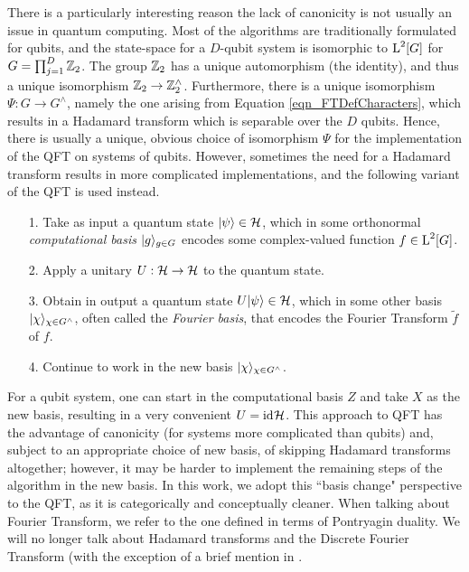 There is a particularly interesting reason the lack of canonicity is not usually an issue in quantum computing. Most of the algorithms are traditionally formulated for qubits, and the state-space for a $D$-qubit system is isomorphic to $\operatorname{L}^2[G]$ for $G = \prod_{j=1}^D \mathbb{Z}_{2}$. The group $\mathbb{Z}_{2}$ has a unique automorphism (the identity), and thus a unique isomorphism $\mathbb{Z}_{2} \rightarrow \mathbb{Z}_{2}^\wedge$. Furthermore, there is a unique isomorphism $\Psi : G \rightarrow G^\wedge$, namely the one arising from Equation \ref{eqn_FTDefCharacters}, which results in a Hadamard transform which is separable over the $D$ qubits. Hence, there is usually a unique, obvious choice of isomorphism $\Psi$ for the implementation of the QFT on systems of qubits. However, sometimes the need for a Hadamard transform results in more complicated implementations, and the following variant of the QFT is used instead.
\begin{enumerate}
  \item[1.] Take as input a quantum state $| \psi \rangle \in  \mathcal{H}$, which in some orthonormal \textit{computational basis} $| g \rangle_{g\in G}$ encodes some complex-valued function $f \in \operatorname{L}^2[G]$.
  \item[2.] Apply a unitary $U : \mathcal{H} \rightarrow \mathcal{H}$ to the quantum state.
  \item[3.] Obtain in output a quantum state $U| \psi \rangle \in \mathcal{H}$, which in some other basis $| \chi \rangle_{\chi\in G^\wedge}$, often called the \emph{Fourier basis}, that encodes the Fourier Transform $\tilde{f}$ of $f$.
  \item[4.] Continue to work in the new basis $| \chi \rangle_{\chi\in G^\wedge}$.
\end{enumerate}

For a qubit system, one can start in the computational basis $Z$ and take $X$ as the new basis, resulting in a very convenient $U = \mathrm{id}_{}{\mathcal{H}}$. This approach to QFT has the advantage of canonicity (for systems more complicated than qubits) and, subject to an appropriate choice of new basis, of skipping Hadamard transforms altogether; however, it may be harder to implement the remaining steps of the algorithm in the new basis. In this work, we  adopt this ``basis change" perspective to the QFT, as it is categorically and conceptually cleaner. When talking about Fourier Transform, we refer to the one defined in terms of Pontryagin duality. We will no longer talk about Hadamard transforms and the Discrete Fourier Transform (with the exception of a brief mention in .

